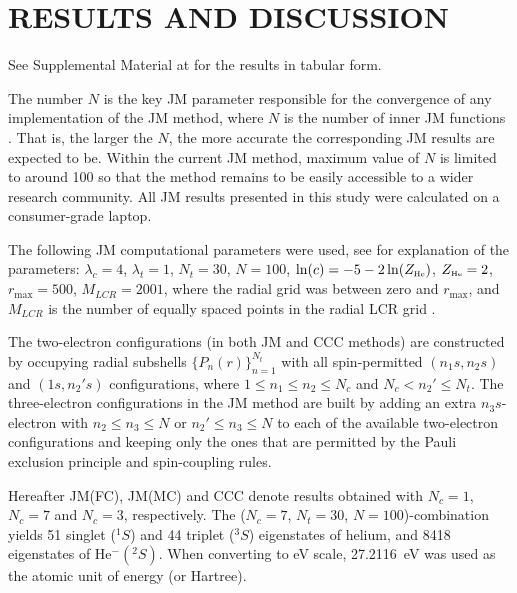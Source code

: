 \documentclass[aip
, pra
, showpacs
, aps
, twocolumn
, groupedaddress
, floatfix
]{revtex4}
\begin{document}
\section{RESULTS AND DISCUSSION}

See Supplemental Material at \cite{JMatrixWebsite} for the results in tabular form.

The number $N$ is the key JM parameter responsible for the convergence of any implementation of the JM method,
where $N$ is the number of inner JM functions \cite{HY74p1201,BR76p1491}.
That is, the larger the $N$, the more accurate the corresponding JM results are expected to be.
Within the current JM method, maximum value of $N$ is limited to around 100 so that the method remains to be easily accessible
to a wider research community. All JM results presented in this study were calculated on a consumer-grade laptop.


The following JM computational parameters were used, see \cite{KB10p022708} for explanation of the parameters:
$\lambda_c=4$, $\lambda_t=1$, $N_t=30$, $N=100$, $\ln(c)=-5 - 2\ln(Z_{\mbox{\tiny{He}}} )$, $Z_{\mbox{\tiny{He}}}=2$, $r_{\max}=500$,
$M_{LCR}=2001$, where the radial grid was between zero and $r_{\max}$, and
$M_{LCR}$ is the number of equally spaced points in the radial LCR grid \cite{KB10p022708}.


The two-electron configurations (in both JM and CCC methods) are constructed by occupying  radial subshells $\{P_n(r)\}_{n=1}^{N_t}$
with all spin-permitted $(n_1s,n_2s)$ and $(1s,n_2's)$ configurations,
where $1 \leq n_1 \leq n_2 \leq N_c$ and $N_c<n_2' \leq N_t$.
The three-electron configurations in the JM method are built by adding an extra $n_3s$-electron with
$ n_2 \leq n_3 \leq N$ or $ n_2' \leq n_3 \leq N$ to each of the available two-electron configurations
and keeping only the ones that are permitted by the Pauli exclusion principle and spin-coupling rules.


Hereafter JM(FC), JM(MC) and CCC denote results obtained with $N_c=1$, $N_c=7$ and $N_c=3$, respectively.
The ($N_c=7$, $N_t=30$, $N=100$)-combination yields 51 singlet ($^1S$) and 44 triplet ($^3S$) eigenstates of helium, and 8418 eigenstates of He$^-(^2S)$.
When converting to eV scale, 27.2116~eV was used as the atomic unit of energy (or Hartree).
\end{document}
